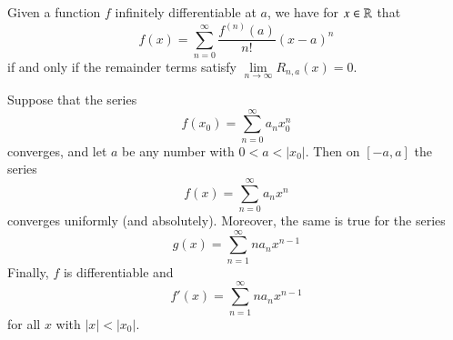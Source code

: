 \documentclass[12pt, a4paper, oneside, openright, titlepage]{book}
\begin{document}
\begin{rmk}
    Given a function $f$ infinitely differentiable at $a$, we have for $x \in \mathbb R$ that \begin{equation*}
        f(x) = \sum\limits_{n=0}^{\infty}\frac{f^{(n)}(a)}{n!}(x-a)^n
    \end{equation*}
    if and only if the remainder terms satisfy $\lim\limits_{n\rightarrow \infty}R_{n,a}(x) = 0$.
\end{rmk}


\begin{thm}
    Suppose that the series \begin{equation*}
        f(x_0) = \sum\limits_{n=0}^{\infty}a_nx_0^n
    \end{equation*}
    converges, and let $a$ be any number with $0 < a < |x_0|$. Then on $[-a,a]$ the series \begin{equation*}
        f(x) = \sum\limits_{n=0}^{\infty}a_nx^n
    \end{equation*}
    converges uniformly (and absolutely). Moreover, the same is true for the series \begin{equation*}
        g(x) = \sum\limits_{n=1}^{\infty}na_nx^{n-1}
    \end{equation*}
    Finally, $f$ is differentiable and \begin{equation*}
        f'(x) = \sum\limits_{n=1}^{\infty}na_nx^{n-1}
    \end{equation*}
    for all $x$ with $|x| < |x_0|$.
\end{thm}
\end{document}
